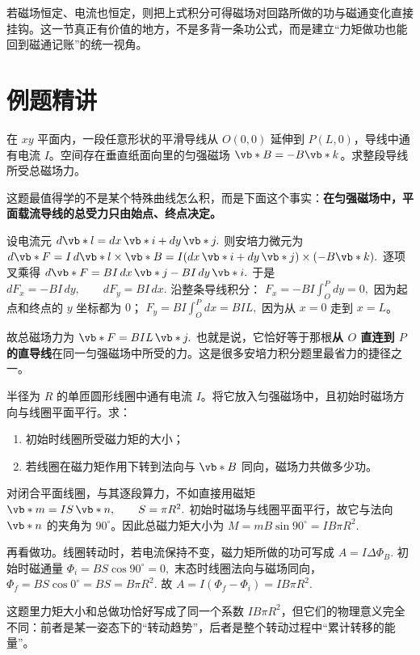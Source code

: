 \documentclass[lang=cn,11pt]{elegantbook}
\begin{document}
\begin{remark}
若磁场恒定、电流也恒定，则把上式积分可得磁场对回路所做的功与磁通变化直接挂钩。这一节真正有价值的地方，不是多背一条功公式，而是建立“力矩做功也能回到磁通记账”的统一视角。
\end{remark}

\section{例题精讲}

\begin{exercise}[任意平面载流导线在匀强磁场中的总受力]
在 \(xy\) 平面内，一段任意形状的平滑导线从 \(O(0,0)\) 延伸到 \(P(L,0)\)，导线中通有电流 \(I\)。空间存在垂直纸面向里的匀强磁场 \(\vb*{B}=-B\vb*{k}\)。求整段导线所受总磁场力。
\end{exercise}

\begin{solution}
这题最值得学的不是某个特殊曲线怎么积，而是下面这个事实：\textbf{在匀强磁场中，平面载流导线的总受力只由始点、终点决定。}

设电流元
 \(d\vb*{l}=dx\,\vb*{i}+dy\,\vb*{j}.\) 
则安培力微元为
 \(d\vb*{F}=I\,d\vb*{l}\times \vb*{B} =I(dx\,\vb*{i}+dy\,\vb*{j})\times(-B\vb*{k}).\) 
逐项叉乘得
 \(d\vb*{F}=BI\,dx\,\vb*{j}-BI\,dy\,\vb*{i}.\) 
于是
 \(dF_x=-BI\,dy,\qquad dF_y=BI\,dx.\) 
沿整条导线积分：
 \(F_x=-BI\int_O^P dy=0,\) 
因为起点和终点的 \(y\) 坐标都为 \(0\)；
 \(F_y=BI\int_O^P dx=BIL,\) 
因为从 \(x=0\) 走到 \(x=L\)。

故总磁场力为
 \(\vb*{F}=BIL\,\vb*{j}.\) 
也就是说，它恰好等于那根\textbf{从 \(O\) 直连到 \(P\) 的直导线}在同一匀强磁场中所受的力。这是很多安培力积分题里最省力的捷径之一。
\end{solution}

\begin{exercise}[圆形线圈在匀强磁场中的力矩与做功]
半径为 \(R\) 的单匝圆形线圈中通有电流 \(I\)。将它放入匀强磁场中，且初始时磁场方向与线圈平面平行。求：
\begin{enumerate}
 \item 初始时线圈所受磁力矩的大小；
 \item 若线圈在磁力矩作用下转到法向与 \(\vb*{B}\) 同向，磁场力共做多少功。
\end{enumerate}
\end{exercise}

\begin{solution}
对闭合平面线圈，与其逐段算力，不如直接用磁矩
 \(\vb*{m}=IS\,\vb*{n}, \qquad S=\pi R^2.\) 
初始时磁场与线圈平面平行，故它与法向 \(\vb*{n}\) 的夹角为 \(90^\circ\)。因此总磁力矩大小为
 \(M=mB\sin 90^\circ =IB\pi R^2.\) 

再看做功。线圈转动时，若电流保持不变，磁力矩所做的功可写成
 \(A=I\Delta\Phi_B.\) 
初始时磁通量
 \(\Phi_i=BS\cos 90^\circ=0,\) 
末态时线圈法向与磁场同向，
 \(\Phi_f=BS\cos 0^\circ=BS=B\pi R^2.\) 
故
 \(A=I(\Phi_f-\Phi_i)=IB\pi R^2.\) 

这题里力矩大小和总做功恰好写成了同一个系数 \(IB\pi R^2\)，但它们的物理意义完全不同：前者是某一姿态下的“转动趋势”，后者是整个转动过程中“累计转移的能量”。
\end{solution}
\end{document}
